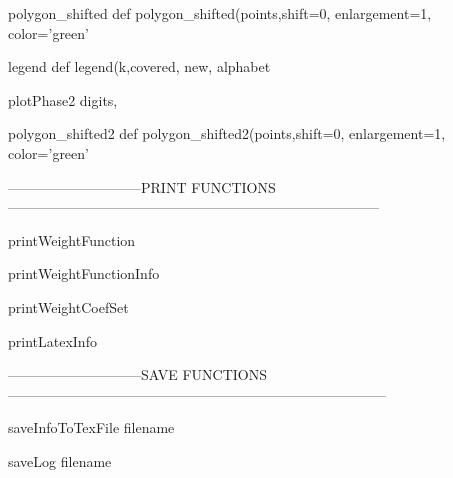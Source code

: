 \begin{method}{polygon\_shifted}{    def polygon\_shifted(points,shift=0, enlargement=1, color='green'}

\end{method}


\begin{method}{legend}{    def legend(k,covered, new, alphabet}

\end{method}


\begin{method}{plotPhase2}{ digits,}

\end{method}


\begin{method}{polygon\_shifted2}{    def polygon\_shifted2(points,shift=0, enlargement=1, color='green'}

\end{method}


-----------------------------PRINT FUNCTIONS--------------------------------------------------------------------------------

\begin{method}{printWeightFunction}{}

\end{method}


\begin{method}{printWeightFunctionInfo}{}

\end{method}


\begin{method}{printWeightCoefSet}{}

\end{method}


\begin{method}{printLatexInfo}{}

\end{method}


-----------------------------SAVE FUNCTIONS---------------------------------------------------------------------------------

\begin{method}{saveInfoToTexFile}{ filename}

\end{method}


\begin{method}{saveLog}{ filename}

\end{method}


